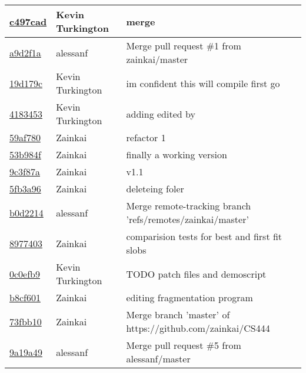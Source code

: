 \begin{tabular}{l l l}
\href{https://github.com/zainkai/CS444/commit/c497cad1a1cd1a7000c86bb569e9379454e2219f}{c497cad} & Kevin Turkington & merge\\\hline
\href{https://github.com/zainkai/CS444/commit/a9d2f1ac4339c8417c4417ee72b80d330284dd79}{a9d2f1a} & alessanf & Merge pull request \#1 from zainkai/master\\\hline
\href{https://github.com/zainkai/CS444/commit/19d179c85a67aca08d0251dbeab418b726df026d}{19d179c} & Kevin Turkington & im confident this will compile first go\\\hline
\href{https://github.com/zainkai/CS444/commit/4183453f70d8da8e11ab86a98cb45af6f9516612}{4183453} & Kevin Turkington & adding edited by\\\hline
\href{https://github.com/zainkai/CS444/commit/59af7807ac70cfc988412f0cca6dddd7ec843943}{59af780} & Zainkai & refactor 1\\\hline
\href{https://github.com/zainkai/CS444/commit/53b984f23b8bc3ee20f48395f3d2cc5fda38c600}{53b984f} & Zainkai & finally a working version\\\hline
\href{https://github.com/zainkai/CS444/commit/9c3f87a7966b54fc340ae3981fcde399089ce65a}{9c3f87a} & Zainkai & v1.1\\\hline
\href{https://github.com/zainkai/CS444/commit/5fb3a96d3ef4e47a9de698e32d78ba0ba9f45a7b}{5fb3a96} & Zainkai & deleteing foler\\\hline
\href{https://github.com/zainkai/CS444/commit/b0d22145ac25d1377ae8500f1d803d3f7be6388c}{b0d2214} & alessanf & Merge remote-tracking branch 'refs/remotes/zainkai/master'\\\hline
\href{https://github.com/zainkai/CS444/commit/8977403e52cc6707259e21c0027d3f6171ac322c}{8977403} & Zainkai & comparision tests for best and first fit slobs\\\hline
\href{https://github.com/zainkai/CS444/commit/0c0efb943c849d62ece32ba712997fbad2cae1c3}{0c0efb9} & Kevin Turkington & TODO patch files and demoscript\\\hline
\href{https://github.com/zainkai/CS444/commit/b8cf601f769f21b74795e1d1e237feff5db60f59}{b8cf601} & Zainkai & editing fragmentation program\\\hline
\href{https://github.com/zainkai/CS444/commit/73fbb1063a9aa805bf213fc7d33642c1e6e2a9ff}{73fbb10} & Zainkai & Merge branch 'master' of https://github.com/zainkai/CS444\\\hline
\href{https://github.com/zainkai/CS444/commit/9a19a49ae47d00125e8effdce9ac3cba4f13def5}{9a19a49} & alessanf & Merge pull request \#5 from alessanf/master\\\hline

\end{tabular}
